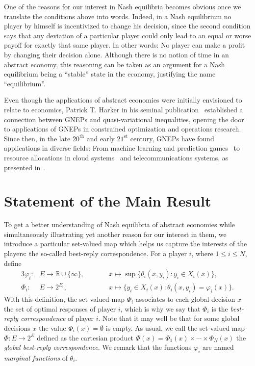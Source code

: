 \documentclass[a4paper,11pt,reqno,english]{amsart}
\theoremstyle{definition}
\begin{document}
One of the reasons for our interest in Nash equilibria becomes obvious once we translate the conditions above into words. Indeed, in a Nash equilibrium no player by himself is incentivized to change his decision, since the second condition says that any deviation of a particular player could only lead to an equal or worse payoff for exactly that same player. In other words: No player can make a profit by changing their decision alone. Although there is no notion of time in an abstract economy, this reasoning can be taken as an argument for a Nash equilibrium being a ``stable'' state in the economy, justifying the name ``equilibrium''.

\medskip
Even though the applications of abstract economies were initially envisioned to relate to economics, Patrick T. Harker in his seminal publication~\cite{Harker1989} established a connection between GNEPs and quasi-variational inequalities, opening the door to applications of GNEPs in constrained optimization and operations research.
Since then, in the late $20^{\text{th}}$ and early $21^{\text{st}}$ century, GNEPs have found applications in diverse fields: From machine learning and prediction games~\cite{SchefferMicheal2009} to resource allocations in cloud systems~\cite{CloudSystems2011} and telecommunications systems, as presented in~\cite{FacchineiKanzow2007}.


\section{Statement of the Main Result}

\medskip
To get a better understanding of Nash equilibria of abstract economies while simultaneously illustrating yet another reason for our interest in them, we introduce a particular set-valued map which helps us capture the interests of the players: the so-called best-reply correspondence.
For a player $i$, where $1\leq i\leq N$, define
\begin{alignat*}{3}
	\varphi_i\colon & E\longrightarrow\mathbb{R}\cup\{\infty\}, & \qquad & x \longmapsto  \sup\{\theta_i(x, y_i) \colon y_i\in X_i(x)\},            \\
	\Phi_i\colon    & E\longrightarrow 2^{E_i},                 & \qquad & x \longmapsto    \{y_i\in X_i(x)\colon \theta_i(x,y_i) = \varphi_i(x)\}.
\end{alignat*}
With this definition, the set valued map $\Phi_i$ associates to each global decision $x$ the set of optimal responses of player $i$, which is why we say that $\Phi_i$ is the \textit{best-reply correspondence} of player $i$.
Note that it may well be that for some global decisions $x$ the value $\Phi_i(x)=\emptyset$ is empty.
As usual, we call the set-valued map $\Phi\colon E\longrightarrow 2^{E}$ defined as the cartesian product $\Phi(x)=\Phi_1(x)\times\cdots\times\Phi_N(x)$ the \textit{global best-reply correspondence}. We remark that the functions $\varphi_i$ are named \textit{marginal functions} of $\theta_i$.
\end{document}
